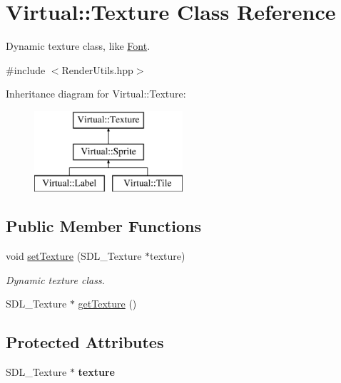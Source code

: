 \hypertarget{class_virtual_1_1_texture}{}\section{Virtual\+:\+:Texture Class Reference}
\label{class_virtual_1_1_texture}


Dynamic texture class, like \hyperlink{class_virtual_1_1_font}{Font}.  




{\ttfamily \#include $<$Render\+Utils.\+hpp$>$}

Inheritance diagram for Virtual\+:\+:Texture\+:\begin{figure}[H]
\begin{center}
\leavevmode
\includegraphics[height=3.000000cm]{class_virtual_1_1_texture}
\end{center}
\end{figure}
\subsection*{Public Member Functions}
\begin{DoxyCompactItemize}
\item 
void \hyperlink{class_virtual_1_1_texture_a8e0ffa6f92bfb5afab975a59f2b3b92f}{set\+Texture} (S\+D\+L\+\_\+\+Texture $\ast$texture)
\begin{DoxyCompactList}\small\item\em Dynamic texture class. \end{DoxyCompactList}\item 
S\+D\+L\+\_\+\+Texture $\ast$ \hyperlink{class_virtual_1_1_texture_a5c870d3c9b6db63922aa5cf451cd3422}{get\+Texture} ()
\end{DoxyCompactItemize}
\subsection*{Protected Attributes}
\begin{DoxyCompactItemize}
\item 
\hypertarget{class_virtual_1_1_texture_ae0101cbb0799e438722a16da7f25653a}{}\label{class_virtual_1_1_texture_ae0101cbb0799e438722a16da7f25653a} 
S\+D\+L\+\_\+\+Texture $\ast$ {\bfseries texture}
\end{DoxyCompactItemize}


